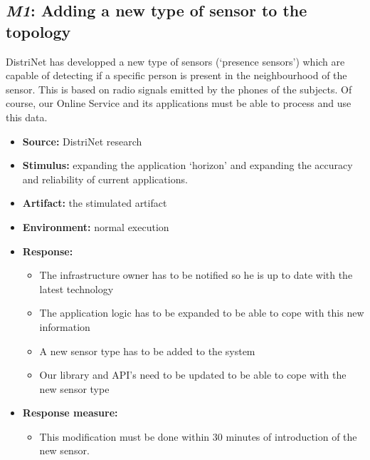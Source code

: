 \documentclass[english]{sareport}
\begin{document}
\subsection{\emph{M1}: Adding a new type of sensor to the topology}
DistriNet has developped a new type of sensors (`presence sensors') which are capable of detecting if a specific person is present in the neighbourhood  of the sensor. This is based on radio signals emitted by the phones of the subjects. Of course, our Online Service and its applications must be able to process and use this data.
\begin{itemize}
    \item \textbf{Source:} DistriNet research
    \item \textbf{Stimulus:} expanding the application `horizon' and expanding the accuracy and reliability of current applications.
    \item \textbf{Artifact:} the stimulated artifact
    \item \textbf{Environment:} normal execution
    \item \textbf{Response:}
        \begin{itemize}
        	\item The infrastructure owner has to be notified so he is up to date with the latest technology
            \item The application logic has to be expanded to be able to cope with this new information
            \item A new sensor type has to be added to the system
            \item Our library and API's need to be updated to be able to cope with the new sensor type
        \end{itemize}

    \item \textbf{Response measure:}
        \begin{itemize}
            \item This modification must be done within 30 minutes of introduction of the new sensor.
        \end{itemize}
\end{itemize}
\end{document}
